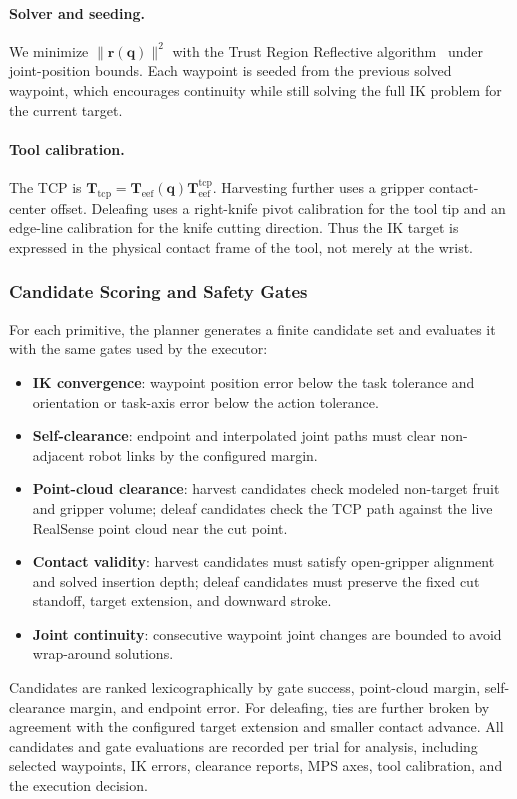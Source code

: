 \paragraph{Solver and seeding.}
We minimize $\|\mathbf{r}(\mathbf{q})\|^2$ with the Trust Region
Reflective algorithm~\cite{branch1999trf} under joint-position bounds.
Each waypoint is seeded from the previous solved waypoint, which
encourages continuity while still solving the full IK problem for the
current target.

\paragraph{Tool calibration.}
The TCP is
$\mathbf{T}_{\mathrm{tcp}}=\mathbf{T}_{\mathrm{eef}}(\mathbf{q})
\mathbf{T}_{\mathrm{eef}}^{\mathrm{tcp}}$.  Harvesting further uses a
gripper contact-center offset.  Deleafing uses a right-knife pivot
calibration for the tool tip and an edge-line calibration for the
knife cutting direction.  Thus the IK target is expressed in the
physical contact frame of the tool, not merely at the wrist.


\subsubsection{Candidate Scoring and Safety Gates}
\label{app:gates}

For each primitive, the planner generates a finite candidate set and
evaluates it with the same gates used by the executor:
%
\begin{itemize}
  \item \textbf{IK convergence}: waypoint position error below the
    task tolerance and orientation or task-axis error below the action
    tolerance.
  \item \textbf{Self-clearance}: endpoint and interpolated joint paths
    must clear non-adjacent robot links by the configured margin.
  \item \textbf{Point-cloud clearance}: harvest candidates check
    modeled non-target fruit and gripper volume; deleaf candidates
    check the TCP path against the live RealSense point cloud near the
    cut point.
  \item \textbf{Contact validity}: harvest candidates must satisfy
    open-gripper alignment and solved insertion depth; deleaf
    candidates must preserve the fixed cut standoff, target extension,
    and downward stroke.
  \item \textbf{Joint continuity}: consecutive waypoint joint changes
    are bounded to avoid wrap-around solutions.
\end{itemize}
%
Candidates are ranked lexicographically by gate success, point-cloud
margin, self-clearance margin, and endpoint error.  For deleafing,
ties are further broken by agreement with the configured target
extension and smaller contact advance.
All candidates and gate evaluations are recorded per trial for
analysis, including selected waypoints, IK errors, clearance reports,
MPS axes, tool calibration, and the execution decision.


